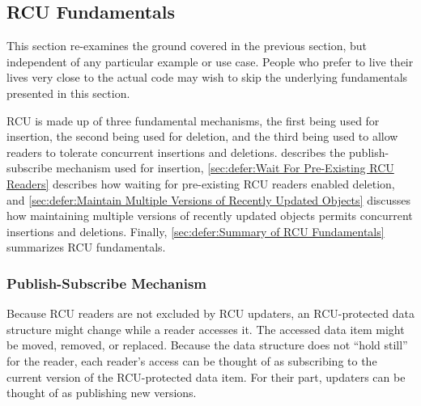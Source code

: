 
\subsection{RCU Fundamentals}
\label{sec:defer:RCU Fundamentals}

This section re-examines the ground covered in the previous section, but
independent of any particular example or use case.
People who prefer to live their lives very close to the actual code may
wish to skip the underlying fundamentals presented in this section.

RCU is made up of three fundamental mechanisms, the first being
used for insertion, the second being used for deletion, and the third
being used to allow readers to tolerate concurrent insertions and deletions.
describes the publish-subscribe mechanism used for insertion,
\cref{sec:defer:Wait For Pre-Existing RCU Readers}
describes how waiting for pre-existing RCU readers enabled deletion,
and
\cref{sec:defer:Maintain Multiple Versions of Recently Updated Objects}
discusses how maintaining multiple versions of recently updated objects
permits concurrent insertions and deletions.
Finally,
\cref{sec:defer:Summary of RCU Fundamentals}
summarizes RCU fundamentals.

\subsubsection{Publish-Subscribe Mechanism}
\label{sec:defer:Publish-Subscribe Mechanism}

Because RCU readers are not excluded by RCU updaters, an RCU-protected
data structure might change while a reader accesses it.
The accessed data item might be moved, removed, or replaced.
Because the data structure does not ``hold still'' for the reader,
each reader's access can be thought of as subscribing to the current
version of the RCU-protected data item.
For their part, updaters can be thought of as publishing new versions.


